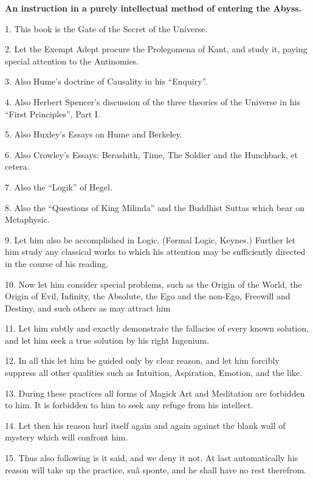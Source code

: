 \textbf{An instruction in a purely intellectual method of entering the Abyss.}


1. This book is the Gate of the Secret of the Universe.

2. Let the Exempt Adept procure the Prolegomena of Kant, and study it, paying special attention to the Antinomies.

3. Also Hume's doctrine of Causality in his \enquote{Enquiry}.

4. Also Herbert Spencer's discussion of the three theories of the Universe in his \enquote{First Principles}, Part I.

5. Also Huxley's Essays on Hume and Berkeley.

6. Also Crowley's Essays: Berashith, Time, The Soldier and the Hunchback, et cetera.

7. Also the \enquote{Logik} of Hegel.

8. Also the \enquote{Questions of King Milinda} and the Buddhist Suttas which bear on Metaphysic.

9. Let him also be accomplished in Logic. (Formal Logic, Keynes.) Further let him study any classical works to which his attention may be sufficiently directed in the course of his reading.

10. Now let him consider special problems, such as the Origin of the World, the Origin of Evil, Infinity, the Absolute, the Ego and the non-Ego, Freewill and Destiny, and such others as may attract him

11. Let him subtly and exactly demonstrate the fallacies of every known solution, and let him seek a true solution by his right Ingenium.

12. In all this let him be guided only by clear reason, and let him forcibly suppress all other qualities such as Intuition, Aspiration, Emotion, and the like.

13. During these practices all forms of Magick Art and Meditation are forbidden to him. It is forbidden to him to seek any refuge from his intellect.

14. Let then his reason hurl itself again and again against the blank wall of mystery which will confront him.

15. Thus also following is it said, and we deny it not. At last automatically his reason will take up the practice, su\^{a} sponte, and he shall have no rest therefrom.

